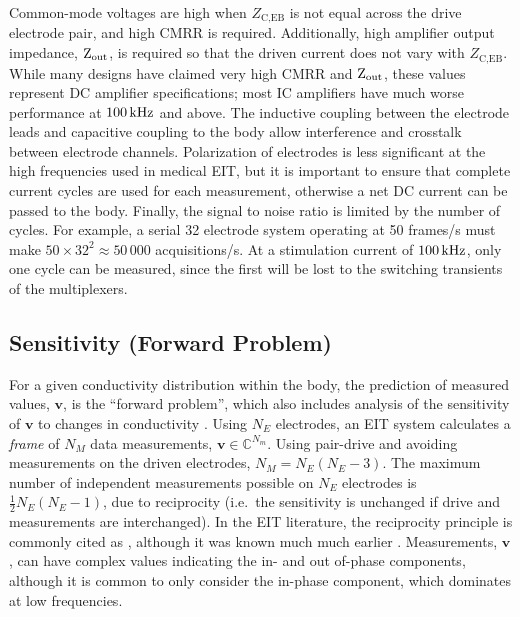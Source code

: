 \documentclass[10pt,journal]{IEEEtran}\def\TBLWIDA{15mm}\def\TBLWIDB{60mm}
\newcommand{\vB}{\mathbf{v}}
\begin{document}
Common-mode voltages are high when $Z_\textrm{C,EB}$ is not 
equal across the drive electrode pair, and high CMRR
is required. Additionally, high amplifier output impedance, $\rm Z_{out}$,
is required so that the driven current does not vary with
$Z_\textrm{C,EB}$. While many designs have claimed very high
CMRR and $\rm Z_{out}$, these values represent DC amplifier
specifications; most IC amplifiers have
much worse performance at $\rm 100\,kHz$ and above.
The inductive coupling between the electrode leads and capacitive
coupling to the body allow interference and crosstalk between
electrode channels.
Polarization of electrodes is less significant at the high
frequencies used in medical EIT, but it is important to ensure
that complete current cycles are used for
each measurement, otherwise a net DC current can be passed
to the body.
Finally, the signal to noise ratio is limited by the number 
of cycles. For example, a serial 32 electrode system
 operating at 50 frames/s
must make $50\times32^2 \approx 50\,000$ acquisitions/s.
At a stimulation
current of $\rm 100\,kHz$, only one cycle can be measured, since
the first will be lost to the switching transients of the multiplexers.




\subsection{Sensitivity (Forward Problem)}

For a given conductivity distribution
within the body, the prediction of measured values, $\vB$,
is the ``forward problem'', which also includes analysis
of the sensitivity of $\vB$ to
changes in conductivity \cite{Cheney1999EIT}.
Using $N_E$ electrodes, an EIT system calculates a {\em frame}
of $N_M$ data measurements, $\vB \in \mathbb{C}^{N_m}$.
 Using pair-drive and avoiding measurements
on the driven electrodes, $N_M  = N_E(N_E-3)$.
The maximum number of independent measurements
possible on $N_E$ electrodes is
 $\frac{1}{2}N_E(N_E-1)$, due to reciprocity (i.e.\ the sensitivity
is unchanged if drive and measurements are interchanged).
In the EIT literature, the reciprocity principle is commonly cited as
\cite{Geselowitz1971Reciprocity}, although it was known much much earlier 
\cite{Lorentz1896Reciprocity}.
Measurements, $\vB$, can have complex values
indicating the in- and out of-phase components, although it is
common to only consider the in-phase component, which dominates
at low frequencies.
\end{document}
